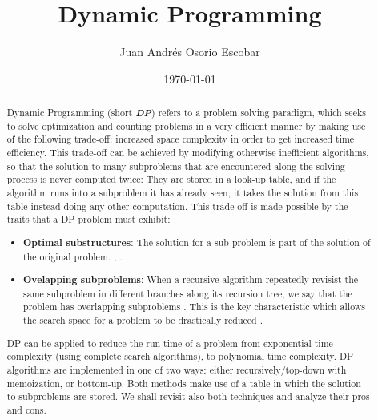 \documentclass{article}
\begin{document}
\title{Dynamic Programming}
\author{Juan Andrés Osorio Escobar}
\date{\today}
\maketitle

\begin{abstract}
Dynamic Programming (short \textbf{\emph{DP}}) refers to a problem solving paradigm,
  which seeks to solve optimization and counting problems in a very efficient manner by 
  making use of the following trade-off: increased space complexity in order to get increased time efficiency. 
  This trade-off can be achieved by modifying otherwise inefficient algorithms, so that the solution to many subproblems
  that are encountered along the solving process is never computed twice: They are stored in a look-up table, and if the algorithm runs into a subproblem it has already seen, it takes the solution from this table
  instead doing any other computation. This trade-off is made  possible by the traits that a DP problem must exhibit: 
  \begin{itemize}
    \item \textbf{Optimal substructures}: The solution for a sub-problem is part of the solution of the original problem. \cite{halim2013competitive}, .
    \item \textbf{Ovelapping subproblems}: When a recursive algorithm repeatedly revisist the same subproblem in different branches along its recursion tree, we say that the problem has overlapping subproblems \cite{cormen2009introduction}. This is the key characteristic
    which allows the search space for a problem to be drastically reduced \cite{halim2013competitive}.
  \end{itemize}
  
  DP can be applied to reduce the run time of a problem from exponential 
  time complexity (using complete search algorithms), to polynomial time complexity. DP algorithms are implemented
  in one of two ways: either recursively/top-down with memoization, or bottom-up. Both methods make use of a table in which the solution to subproblems are stored.
  We shall revisit also both techniques and analyze their pros and cons.


\end{abstract}
\end{document}
